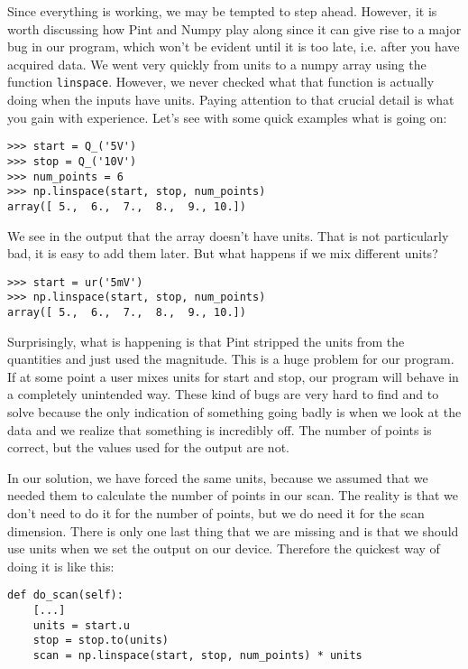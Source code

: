Since everything is working, we may be tempted to step ahead. However, it is worth discussing how Pint and Numpy play along since it can give rise to a major bug in our program, which won't be evident until it is too late, i.e. after you have acquired data. We went very quickly from units to a numpy array using the function \texttt{linspace}. However, we never checked what that function is actually doing when the inputs have units. Paying attention to that crucial detail is what you gain with experience. Let's see with some quick examples what is going on:

\begin{verbatim}
>>> start = Q_('5V')
>>> stop = Q_('10V')
>>> num_points = 6
>>> np.linspace(start, stop, num_points)
array([ 5.,  6.,  7.,  8.,  9., 10.])
\end{verbatim}

We see in the output that the array doesn't have units. That is not particularly bad, it is easy to add them later. But what happens if we mix different units?

\begin{verbatim}
>>> start = ur('5mV')
>>> np.linspace(start, stop, num_points)
array([ 5.,  6.,  7.,  8.,  9., 10.])
\end{verbatim}

Surprisingly, what is happening is that Pint stripped the units from the quantities and just used the magnitude. This is a huge problem for our program. If at some point a user mixes units for start and stop, our program will behave in a completely unintended way. These kind of bugs are very hard to find and to solve because the only indication of something going badly is when we look at the data and we realize that something is incredibly off. The number of points is correct, but the values used for the output are not. 

In our solution, we have forced the same units, because we assumed that we needed them to calculate the number of points in our scan. The reality is that we don't need to do it for the number of points, but we do need it for the scan dimension. There is only one last thing that we are missing and is that we should use units when we set the output on our device. Therefore the quickest way of doing it is like this:

\begin{verbatim}
def do_scan(self):
    [...]
    units = start.u
    stop = stop.to(units)
    scan = np.linspace(start, stop, num_points) * units
\end{verbatim}


